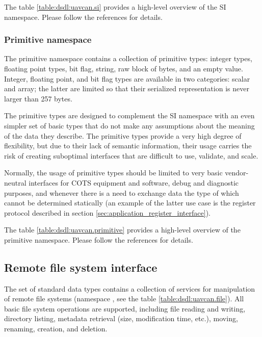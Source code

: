 The table \ref{table:dsdl:uavcan.si} provides a high-level overview of the SI namespace.
Please follow the references for details.


\subsubsection{Primitive namespace}

The primitive namespace contains a collection of primitive types:
integer types, floating point types, bit flag, string, raw block of bytes, and an empty value.
Integer, floating point, and bit flag types are available in two categories: scalar and array;
the latter are limited so that their serialized representation is never larger than 257 bytes.

The primitive types are designed to complement the SI namespace with an even simpler set of basic types
that do not make any assumptions about the meaning of the data they describe.
The primitive types provide a very high degree of flexibility, but due to their lack of semantic information,
their usage carries the risk of creating suboptimal interfaces that are difficult to use, validate, and scale.

Normally, the usage of primitive types should be limited to very basic vendor-neutral interfaces for COTS
equipment and software, debug and diagnostic purposes, and whenever there is a need to exchange data the
type of which cannot be determined statically (an example of the latter use case is the register protocol
described in section \ref{sec:application_register_interface}).

The table \ref{table:dsdl:uavcan.primitive} provides a high-level overview of the primitive namespace.
Please follow the references for details.


\subsection{Remote file system interface}\label{sec:application_file_system}

The set of standard data types contains a collection of services for manipulation of remote file systems
(namespace , see the table \ref{table:dsdl:uavcan.file}).
All basic file system operations are supported, including file reading and writing,
directory listing, metadata retrieval (size, modification time, etc.), moving, renaming, creation, and deletion.

